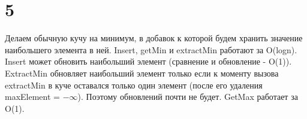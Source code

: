 \documentclass[12pt]{extarticle}
\begin{document}
\section*{5}
Делаем обычную кучу на минимум, в добавок к которой будем хранить значение наибольшего элемента в ней.
Insert, getMin и extractMin работают за O(logn).
Insert может обновить наибольший элемент (сравнение и обновление - O(1)). ExtractMin обновляет наибольший элемент только если к моменту вызова extractMin в куче оставался только один элемент (после его удаления maxElement = $-\infty$). Поэтому обновлений почти не будет. GetMax работает за O(1).
\end{document}

